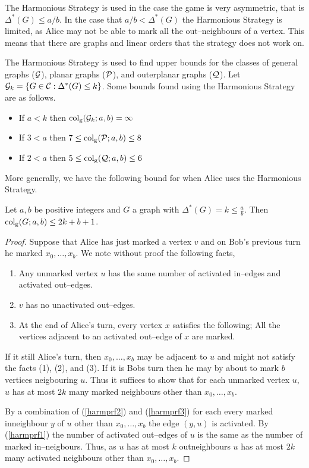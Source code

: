The Harmonious Strategy is used in the case the game is very asymmetric, that is $\Delta^*(G)\leq a/b$. In the case that $a/b < \Delta^*(G)$ the Harmonious Strategy is limited, as Alice may not be able to mark all the out--neighbours of a vertex. This means that there are graphs and linear orders that the strategy does not work on.

The Harmonious Strategy is used to find upper bounds for the classes of general graphs ($ \mathcal{G} $), planar graphs ($\mathcal{P}$), and outerplanar graphs ($ \mathcal{Q} $). Let $\mathcal{G}_k= \{G\in\mathcal{C}: \Delta^*(G)\leq k\}$. Some bounds found using the Harmonious Strategy are as follows.    
\begin{itemize}
    \item If $a < k$ then $\operatorname{col_g}(\mathcal{G}_k;a,b)=\infty$
    \item If $3<a $ then $7\leq \operatorname{col_g}(\mathcal{P};a,b)\leq 8$
    \item If $2< a$ then $5\leq \operatorname{col_g}(\mathcal{Q};a,b)\leq 6$
\end{itemize}
More generally, we have the following bound for when Alice uses the Harmonious Strategy.
\begin{theorem}
    Let $a,b$ be positive integers and $G$ a graph with $\Delta^*(G)=k\leq\frac{a}{b}$. Then $\operatorname{col_g}(G;a,b)\leq 2k+b+1$.
\end{theorem}

\begin{proof}Suppose that Alice has just marked a vertex $v$ and on Bob's previous turn he marked $x_0,\dots,x_b$.
    We note without proof the following facts, 
    \begin{enumerate}[(1)]
        \item Any unmarked vertex $u$ has the same number of activated in--edges and activated out--edges. \label{harmprf1} 
        \item $v$ has no unactivated out--edges. \label{harmprf2}
        \item At the end of Alice's turn, every vertex $x$ satisfies the following; All the vertices adjacent to an activated out--edge of $x$ are marked. \label{harmprf3}
    \end{enumerate}
If it still Alice's turn, then $x_0,\dots,x_b$ may be adjacent to $u$ and might not satisfy the facts (1), (2), and (3). If it is Bobs turn then he may by about to mark $b$ vertices neigbouring $u$. Thus it suffices to show that for each unmarked vertex $u$, $u$ has at most $2k$ many marked neighbours other than $x_0,\dots,x_b$.

By a combination of (\ref{harmprf2}) and (\ref{harmprf3}) for each every marked inneighbour $y$  of $u$ other than $x_0,\dots,x_b$ the edge $(y,u)$ is activated. By (\ref{harmprf1}) the number of activated out--edges of $u$ is the same as the number of marked in--neigbours. Thus, as $u$ has at most $k$ outneighbours $u$ has at most $2k$ many activated neighbours other than $x_0,\dots,x_b$.
\end{proof}

